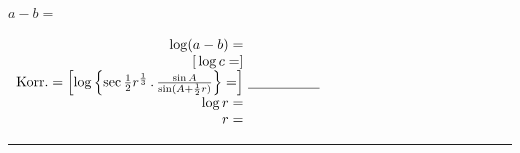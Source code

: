 \par\bigskip
\noindent\begin{minipage}[t]{.34\linewidth}\centering $a-b=$\end{minipage}\hfill
\begin{minipage}[t]{.65\linewidth}\raggedleft
$\begin{array}{r@{\ }l}
\log(a-b)=&\\
{[}\log c=]&\\
\mathrm{Korr.}=\left[\log\left\{\sec\tfrac12r^{\frac13}\,.\,\frac{\sin A}{\sin(A+\frac12r)}\right\}=\right]&\underline{\hspace{1.8cm}}\\
\log r=&\\
r=&
\end{array}$
\end{minipage}
\begin{center}\vspace{1cm}\rule{2.7cm}{.4pt}\end{center}

